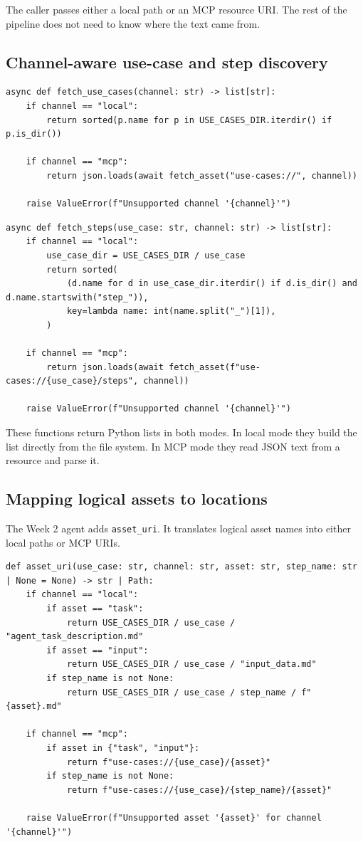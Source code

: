 \documentclass[12pt, a4paper]{article}
\begin{document}
The caller passes either a local path or an MCP resource URI. The rest of the pipeline does not need to know where the text came from.

\subsection{Channel-aware use-case and step discovery}

\begin{lstlisting}[style=pythonstyle]
async def fetch_use_cases(channel: str) -> list[str]:
    if channel == "local":
        return sorted(p.name for p in USE_CASES_DIR.iterdir() if p.is_dir())

    if channel == "mcp":
        return json.loads(await fetch_asset("use-cases://", channel))

    raise ValueError(f"Unsupported channel '{channel}'")
\end{lstlisting}

\begin{lstlisting}[style=pythonstyle]
async def fetch_steps(use_case: str, channel: str) -> list[str]:
    if channel == "local":
        use_case_dir = USE_CASES_DIR / use_case
        return sorted(
            (d.name for d in use_case_dir.iterdir() if d.is_dir() and d.name.startswith("step_")),
            key=lambda name: int(name.split("_")[1]),
        )

    if channel == "mcp":
        return json.loads(await fetch_asset(f"use-cases://{use_case}/steps", channel))

    raise ValueError(f"Unsupported channel '{channel}'")
\end{lstlisting}

These functions return Python lists in both modes. In local mode they build the list directly from the file system. In MCP mode they read JSON text from a resource and parse it.

\subsection{Mapping logical assets to locations}

The Week 2 agent adds \texttt{asset\_uri}. It translates logical asset names into either local paths or MCP URIs.

\begin{lstlisting}[style=pythonstyle]
def asset_uri(use_case: str, channel: str, asset: str, step_name: str | None = None) -> str | Path:
    if channel == "local":
        if asset == "task":
            return USE_CASES_DIR / use_case / "agent_task_description.md"
        if asset == "input":
            return USE_CASES_DIR / use_case / "input_data.md"
        if step_name is not None:
            return USE_CASES_DIR / use_case / step_name / f"{asset}.md"

    if channel == "mcp":
        if asset in {"task", "input"}:
            return f"use-cases://{use_case}/{asset}"
        if step_name is not None:
            return f"use-cases://{use_case}/{step_name}/{asset}"

    raise ValueError(f"Unsupported asset '{asset}' for channel '{channel}'")
\end{lstlisting}
\end{document}
